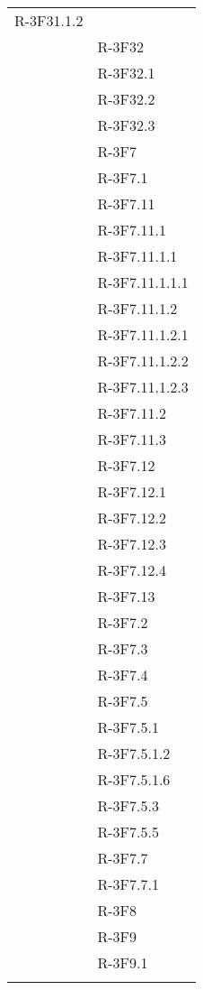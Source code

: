 \begin{longtable}{l p{3cm}}
	R-3F31.1.2 \tabularnewline &
	
	R-3F32 \tabularnewline &
	
	R-3F32.1 \tabularnewline &
	
	R-3F32.2 \tabularnewline &
	
	R-3F32.3 \tabularnewline &
	
	R-3F7 \tabularnewline &
	
	R-3F7.1 \tabularnewline &
	
	R-3F7.11 \tabularnewline &
	
	R-3F7.11.1 \tabularnewline &
	
	R-3F7.11.1.1 \tabularnewline &
	
	R-3F7.11.1.1.1 \tabularnewline &
	
	R-3F7.11.1.2 \tabularnewline &
	
	R-3F7.11.1.2.1 \tabularnewline &
	
	R-3F7.11.1.2.2 \tabularnewline &
	
	R-3F7.11.1.2.3 \tabularnewline &
	
	R-3F7.11.2 \tabularnewline &
	
	R-3F7.11.3 \tabularnewline &
	
	R-3F7.12 \tabularnewline &
	
	R-3F7.12.1 \tabularnewline &
	
	R-3F7.12.2 \tabularnewline &
	
	R-3F7.12.3 \tabularnewline &
	
	R-3F7.12.4 \tabularnewline &
	
	R-3F7.13 \tabularnewline &
	
	R-3F7.2 \tabularnewline &
	
	R-3F7.3 \tabularnewline &
	
	R-3F7.4 \tabularnewline &
	
	R-3F7.5 \tabularnewline &
	
	R-3F7.5.1 \tabularnewline &
	
	R-3F7.5.1.2 \tabularnewline &
	
	R-3F7.5.1.6 \tabularnewline &
	
	R-3F7.5.3 \tabularnewline &
	
	R-3F7.5.5 \tabularnewline &
	
	R-3F7.7 \tabularnewline &
	
	R-3F7.7.1 \tabularnewline &
	
	R-3F8 \tabularnewline &
	
	R-3F9 \tabularnewline &
	
	R-3F9.1 \tabularnewline &
	

\end{longtable}
